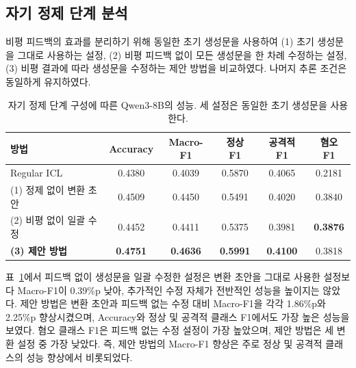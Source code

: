 \subsection{자기 정제 단계 분석}

비평 피드백의 효과를 분리하기 위해 동일한 초기 생성문을 사용하여
(1) 초기 생성문을 그대로 사용하는 설정, (2) 비평 피드백 없이 모든
생성문을 한 차례 수정하는 설정, (3) 비평 결과에 따라 생성문을
수정하는 제안 방법을 비교하였다. 나머지 추론 조건은 동일하게
유지하였다.

\begin{table}[t]
\centering
\scriptsize
\setlength{\tabcolsep}{8pt}
\begin{tabular}{@{}lccccc@{}}
\toprule
\textbf{방법} & \textbf{Accuracy} & \textbf{Macro-F1}
& \textbf{정상 F1} & \textbf{공격적 F1} & \textbf{혐오 F1} \\
\midrule
Regular ICL                 & 0.4380 & 0.4039 & 0.5870 & 0.4065 & 0.2181 \\
(1) 정제 없이 변환 초안    & 0.4509 & 0.4450 & 0.5491 & 0.4020 & 0.3840 \\
(2) 비평 없이 일괄 수정    & 0.4452 & 0.4411 & 0.5375 & 0.3981 & \textbf{0.3876} \\
\textbf{(3) 제안 방법}      & \textbf{0.4751} & \textbf{0.4636}
                            & \textbf{0.5991} & \textbf{0.4100} & 0.3818 \\
\bottomrule
\end{tabular}
\caption{자기 정제 단계 구성에 따른 Qwen3-8B의 성능. 세 설정은
동일한 초기 생성문을 사용한다.}
\label{tab:self_refinement_ablation}
\end{table}

표~\ref{tab:self_refinement_ablation}에서 피드백 없이 생성문을 일괄
수정한 설정은 변환 초안을 그대로 사용한 설정보다 Macro-F1이
0.39\%p 낮아, 추가적인 수정 자체가 전반적인 성능을 높이지는 않았다.
제안 방법은 변환 초안과 피드백 없는 수정 대비 Macro-F1을 각각
1.86\%p와 2.25\%p 향상시켰으며, Accuracy와 정상 및 공격적 클래스
F1에서도 가장 높은 성능을 보였다. 혐오 클래스 F1은 피드백 없는 수정
설정이 가장 높았으며, 제안 방법은 세 변환 설정 중 가장 낮았다. 즉,
제안 방법의 Macro-F1 향상은 주로 정상 및 공격적 클래스의 성능
향상에서 비롯되었다.
